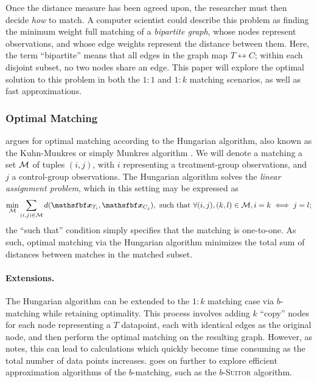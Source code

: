 \documentclass[11pt]{extarticle}
\begin{document}
Once the distance measure has been agreed upon, the researcher must then decide \emph{how} to match. A computer scientist could describe this problem as finding the minimum weight full matching of a \emph{bipartite graph}, whose nodes represent observations, and whose edge weights represent the distance between them. Here, the term ``bipartite'' means that all edges in the graph map $T \leftrightarrow C$; within each disjoint subset, no two nodes share an edge. This paper will explore the optimal solution to this problem in both the $1:1$ and $1:k$ matching scenarios, as well as fast approximations.


\subsubsection{Optimal Matching}

\textcite{rosenbaum_optimal_1989} argues for optimal matching according to the Hungarian algorithm, also known as the Kuhn-Munkres or simply Munkres algorithm \parencite{munkres_algorithms_1957}. We will denote a matching a set $\mathcal{M}$ of tuples $(i, j)$, with $i$ representing a treatment-group observations, and $j$ a control-group observations. The Hungarian algorithm solves the \emph{linear assignment problem}, which in this setting may be expressed as
\begin{equation}
  \min_{\set{M}} \sum_{(i, j) \in \set{M}} d(\vec{x}_{T_{i}}, \vec{x}_{C_{j}}), \text{ such that } \forall (i, j), (k, l) \in \set{M}, i = k \iff j = l;
\end{equation}
the ``such that'' condition simply specifies that the matching is one-to-one. As such, optimal matching via the Hungarian algorithm minimizes the total sum of distances between matches in the matched subset.

\paragraph{Extensions.} The Hungarian algorithm can be extended to the $1:k$ matching case via $b$-matching while retaining optimality.
This process involves adding $k$ ``copy'' nodes for each node representing a $T$ datapoint, each with identical edges as the original node, and then perform the optimal matching on the resulting graph.
However, as \textcite{khan_efficient_2016} notes, this can lead to calculations which quickly become time consuming as the total number of data points increases. \textcite{khan_efficient_2016} goes on further to explore efficient approximation algorithms of the $b$-matching, such as the $b$-\textsc{Suitor} algorithm.
\end{document}
